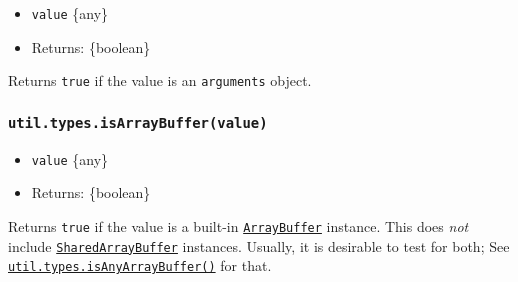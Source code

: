 \begin{itemize}
\tightlist
\item
  \texttt{value} \{any\}
\item
  Returns: \{boolean\}
\end{itemize}

Returns \texttt{true} if the value is an \texttt{arguments} object.

\begin{Shaded}
\begin{Highlighting}[]
 \NormalTok{() \{}
\NormalTok{(}\NormalTok{)}\OperatorTok{;}  
\NormalTok{\}}
\end{Highlighting}
\end{Shaded}

\subsubsection{\texorpdfstring{\texttt{util.types.isArrayBuffer(value)}}{util.types.isArrayBuffer(value)}}\label{util.types.isarraybuffervalue}

\begin{itemize}
\tightlist
\item
  \texttt{value} \{any\}
\item
  Returns: \{boolean\}
\end{itemize}

Returns \texttt{true} if the value is a built-in
\href{https://developer.mozilla.org/en-US/docs/Web/JavaScript/Reference/Global_Objects/ArrayBuffer}{\texttt{ArrayBuffer}}
instance. This does \emph{not} include
\href{https://developer.mozilla.org/en-US/docs/Web/JavaScript/Reference/Global_Objects/SharedArrayBuffer}{\texttt{SharedArrayBuffer}}
instances. Usually, it is desirable to test for both; See
\hyperref[utiltypesisanyarraybuffervalue]{\texttt{util.types.isAnyArrayBuffer()}}
for that.

\begin{Shaded}
\begin{Highlighting}[]
\NormalTok{(} \NormalTok{())}\OperatorTok{;}  
\NormalTok{(} \NormalTok{())}\OperatorTok{;}  
\end{Highlighting}
\end{Shaded}

